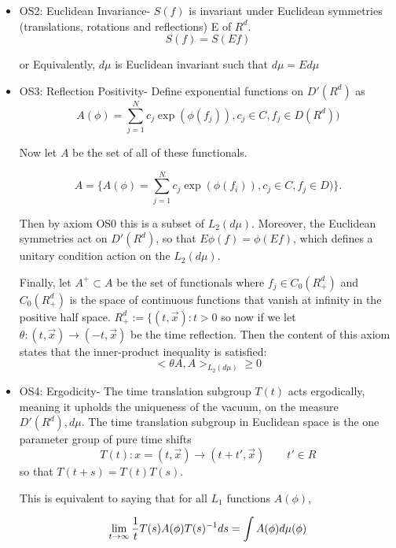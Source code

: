 \documentclass{article}
\newcommand{\1}{\mathbbm{1}}
\theoremstyle{plain}
\theoremstyle{definition}
\numberwithin{equation}{section}
\begin{document}
\begin{itemize}
    \item OS2: Euclidean Invariance- $S(f)$ is invariant under Euclidean symmetries (translations, rotations and reflections) E of $R^d$.
    \begin{equation}
        S(f)= S(Ef)
    \end{equation}

    or Equivalently, $d\mu$ is Euclidean invariant such that $d\mu = E d\mu$

    \item OS3: Reflection Positivity- Define exponential functions on $D'(R^d)$ as
    \begin{equation}
         A(\phi)= \sum_{j=1}^N c_j \exp (\phi(f_j)), c_j \in C, f_j \in D(R^d))
    \end{equation}

     Now let $A$ be the set of all of these functionals. 

      \begin{equation}
        A = \{ A(\phi)= \sum_{j=1}^N c_j \exp (\phi(f_i)), c_j \in C, f_j \in D)\}.
    \end{equation}
     
     Then by axiom OS0 this is a subset of $L_2(d \mu)$. Moreover, the Euclidean symmetries act on $D'(R^d)$, so that $E \phi(f) = \phi(Ef)$, which defines a unitary condition action on the $L_2(d \mu)$. 

     Finally, let $A^+ \subset  A $ be the set of functionals where $f_j \in C_0(R_{+}^d)$ and $C_0(R_{+}^d)$ is the space of continuous functions that vanish at infinity in the positive half space. $R_+^d := \{ (t, \vec{x}): t > 0$ so now if we let $\theta: (t , \vec{x}) \rightarrow (-t, \vec{x})$ be the time reflection. Then the content of this axiom states that the inner-product inequality is satisfied:  
     \begin{equation}
         < \theta A, A >_{L_2(d \mu)}\geq 0 
     \end{equation}
     
    \item OS4: Ergodicity- The time translation subgroup $T(t)$ acts ergodically, meaning it upholds the uniqueness of the vacuum, on the measure $D'(R^d), d\mu$. The time translation subgroup in Euclidean space is the one parameter group of pure time shifts 
    \begin{equation}
        T(t) : x = (t, \vec{x})\rightarrow (t+ t', \vec{x}) \qquad t'\in R 
    \end{equation}
so that $T(t+s)= T(t) T(s)$. 

This is equivalent to saying that for all $L_{1}$ functions $A(\phi)$, 

\begin{equation}
    \lim_{t \rightarrow \infty} {1 \over t} T(s) A(\phi) T(s)^{-1} ds = \int A (\phi) d \mu(\phi)
\end{equation}

\end{itemize}
\end{document}
